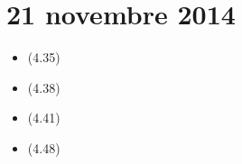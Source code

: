 \section{21 novembre 2014}

\begin{itemize}
    \item (4.35)
    \item (4.38)
    \item (4.41)
    \item (4.48)
\end{itemize}